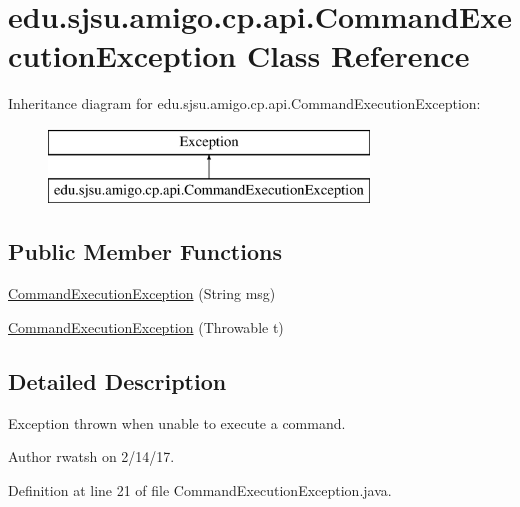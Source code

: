 \hypertarget{classedu_1_1sjsu_1_1amigo_1_1cp_1_1api_1_1_command_execution_exception}{}\section{edu.\+sjsu.\+amigo.\+cp.\+api.\+Command\+Execution\+Exception Class Reference}
\label{classedu_1_1sjsu_1_1amigo_1_1cp_1_1api_1_1_command_execution_exception}
Inheritance diagram for edu.\+sjsu.\+amigo.\+cp.\+api.\+Command\+Execution\+Exception\+:\begin{figure}[H]
\begin{center}
\leavevmode
\includegraphics[height=2.000000cm]{classedu_1_1sjsu_1_1amigo_1_1cp_1_1api_1_1_command_execution_exception}
\end{center}
\end{figure}
\subsection*{Public Member Functions}
\begin{DoxyCompactItemize}
\item 
\hyperlink{classedu_1_1sjsu_1_1amigo_1_1cp_1_1api_1_1_command_execution_exception_a8793f1fd899212c9f21cac46ce5fc59c}{Command\+Execution\+Exception} (String msg)
\item 
\hyperlink{classedu_1_1sjsu_1_1amigo_1_1cp_1_1api_1_1_command_execution_exception_afd09d82adb8cb75d73e1d57c70034037}{Command\+Execution\+Exception} (Throwable t)
\end{DoxyCompactItemize}


\subsection{Detailed Description}
Exception thrown when unable to execute a command.

\begin{DoxyAuthor}{Author}
rwatsh on 2/14/17. 
\end{DoxyAuthor}


Definition at line 21 of file Command\+Execution\+Exception.\+java.




